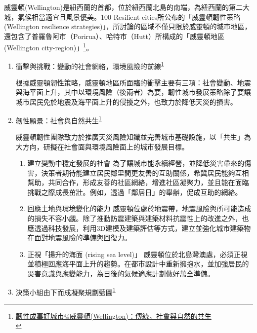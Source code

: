 \documentclass[a4paper,12pt]{article}
\begin{document}
\begin{enumerate}
威靈頓(Wellington)是紐西蘭的首都，位於紐西蘭北島的南端，為紐西蘭的第二大城，氣候相當適宜且風景優美。100 Resilient cities所公布的「威靈頓韌性策略(Wellington resilience strategies)」，所討論的區域不僅只限於威靈頓的城市地區，還包含了普羅魯阿市（Porirua）、哈特市（Hutt）所構成的「威靈頓地區(Wellington city-region)」\footnote{\href{https://eyesonplace.net/2018/12/19/9738/}{韌性成事好城市@威靈頓(Wellington)：傳統，社會與自然的共生}\\\label{org2984544}}。\\
\begin{enumerate}
\item 衝擊與挑戰：變動的社會網絡，環境風險的前線\textsuperscript{\ref{org2984544}}
\label{sec:orgd39b2d0}

根據威靈頓韌性策略，威靈頓地區所面臨的衝擊主要有三項：社會變動、地震與海平面上升，其中以環境風險（後兩者）為要，韌性城市發展策略除了要讓城市居民免於地震及海平面上升的侵擾之外，也致力於降低天災的損害。\\

\item 韌性願景：社會與自然共生\textsuperscript{\ref{org2984544}}
\label{sec:org251883c}

威靈頓韌性團隊致力於推廣天災風險知識並完善城市基礎設施，以「共生」為大方向，研擬在社會面與環境風險面上的城市發展目標。\\
\begin{enumerate}
\item 建立變動中穩定發展的社會   為了讓城市能永續經營，並降低災害帶來的傷害，決策者期待能建立居民鄰里間更友善的互助關係，希冀居民能夠互相幫助，共同合作，形成友善的社區網絡，增進社區凝聚力，並且能在面臨挑戰之際成長茁壯。例如，透過「鄰居日」的舉辦，促成互助的網絡。\\
\item 回應土地與環境變化的能力   威靈頓位處於地震帶，地震風險與所可能造成的損失不容小覷。除了推動防震建築與建築材料抗震性上的改進之外，也應透過科技發展，利用3D建模及建築評估等方式，建立並強化城市建築物在面對地震風險的準備與回復力。\\
\item 正視「揚升的海面 (rising sea level)」   威靈頓位於北島灣澳處，必須正視並積極回應海平面上升的趨勢。在都市設計中重新擁抱水，並加強居民的災害意識與應變能力，為日後的氣候適應計劃做好萬全準備。\\
\end{enumerate}

\item 決策小組由下而成凝聚規劃藍圖\textsuperscript{\ref{org2984544}}
\label{sec:org616f7a6}


\end{enumerate}
\end{enumerate}
\end{document}
